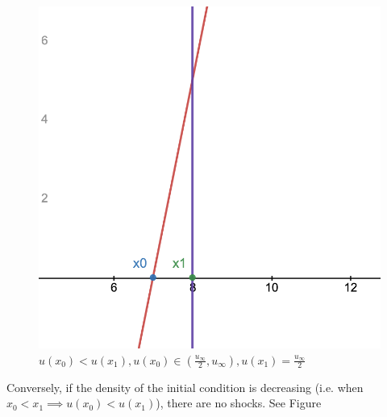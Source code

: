 \documentclass[12pt]{article}
\begin{document}
\begin{figure}[!htb]
    \caption{$u(x_0) < u(x_1), u(x_0), u(x_1) \in (\frac{u_\infty}{2}, u_\infty)$}\label{fig:shock_x1_x2_gt_half}
    \endminipage\hfill
    \includegraphics[width=\linewidth]{shock_x1_eq_half.png}
    \caption{$u(x_0) < u(x_1), u(x_0) \in (\frac{u_\infty}{2}, u_\infty), u(x_1) = \frac{u_\infty}{2} $}\label{fig:shock_x1_eq_half}
    \endminipage
\end{figure}

Conversely, if the density of the initial condition is decreasing (i.e. when $x_0 < x_1 \implies u(x_0) < u(x_1)$), there are no shocks. See Figure 
\end{document}
